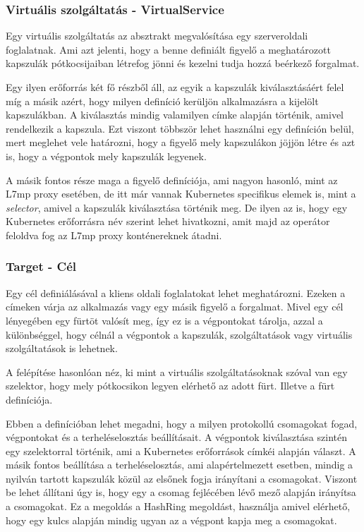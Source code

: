 \subsubsection{Virtuális szolgáltatás - VirtualService}

Egy virtuális szolgáltatás az absztrakt megvalósítása egy szerveroldali foglalatnak. 
Ami azt jelenti, hogy a benne definiált figyelő a meghatározott kapszulák pótkocsijaiban 
létrefog jönni és kezelni tudja hozzá beérkező forgalmat. 

Egy ilyen erőforrás két fő részből áll, az egyik a kapszulák kiválasztásáért felel míg
a másik azért, hogy milyen definíció kerüljön alkalmazásra a kijelölt kapszulákban.
A kiválasztás mindig valamilyen címke alapján történik, amivel rendelkezik a kapszula. 
Ezt viszont többször lehet használni egy definíción belül, mert meglehet vele határozni,
hogy a figyelő mely kapszulákon jöjjön létre és azt is, hogy a végpontok mely kapszulák 
legyenek. 

A másik fontos része maga a figyelő definíciója, ami nagyon hasonló, mint az L7mp proxy
esetében, de itt már vannak Kubernetes specifikus elemek is, mint a \textit{selector},
amivel a kapszulák kiválasztása történik meg. De ilyen az is, hogy egy Kubernetes 
erőforrásra név szerint lehet hivatkozni, amit majd az operátor feloldva fog az L7mp
proxy konténereknek átadni.

\subsubsection{Target - Cél}

Egy cél definiálásával a kliens oldali foglalatokat lehet meghatározni. Ezeken 
a címeken várja az alkalmazás vagy egy másik figyelő a forgalmat. Mivel egy cél 
lényegében egy fürtöt valósít meg, így ez is a végpontokat tárolja, azzal a különbséggel,
hogy célnál a végpontok a kapszulák, szolgáltatások vagy virtuális szolgáltatások is 
lehetnek. 

A felépítése hasonlóan néz, ki mint a virtuális szolgáltatásoknak szóval van egy 
szelektor, hogy mely pótkocsikon legyen elérhető az adott fürt. Illetve a fürt
definíciója. 

Ebben a definícióban lehet megadni, hogy a milyen protokollú csomagokat fogad, végpontokat
és a terheléselosztás beállításait. A végpontok kiválasztása szintén egy szelektorral
történik, ami a Kubernetes erőforrások címkéi alapján választ. A másik fontos beállítása
a terheléselosztás, ami alapértelmezett esetben, mindig a nyilván tartott kapszulák 
közül az elsőnek fogja irányítani a csomagokat. Viszont be lehet állítani úgy is, hogy
egy a csomag fejlécében lévő mező alapján irányítsa a csomagokat. Ez a megoldás a
HashRing megoldást, használja amivel elérhető, hogy egy kulcs alapján mindig ugyan az
a végpont kapja meg a csomagokat. 

